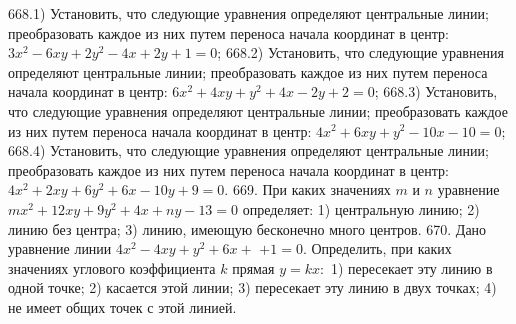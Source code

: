 668.1) Установить, что следующие уравнения определяют центральные линии; преобразовать каждое из них путем переноса начала координат в центр: $3 x^2-6 x y+2 y^2-4 x+2 y+1=0$;
668.2) Установить, что следующие уравнения определяют центральные линии; преобразовать каждое из них путем переноса начала координат в центр: $6 x^2+4 x y+y^2+4 x-2 y+2=0$;
668.3) Установить, что следующие уравнения определяют центральные линии; преобразовать каждое из них путем переноса начала координат в центр: $4 x^2+6 x y+y^2-10 x-10=0$;
668.4) Установить, что следующие уравнения определяют центральные линии; преобразовать каждое из них путем переноса начала координат в центр: $4 x^2+2 x y+6 y^2+6 x-10 y+9=0$.
669. При каких значениях $m$ и $n$ уравнение $m x^2+12 x y+9 y^2+4 x+n y-13=0$ определяет: 1) центральную линию; 2) линию без центра; 3) линию, имеющую бесконечно много центров.
670. Дано уравнение линии $4 x^2-4 x y+y^2+6 x+$ $+1=0$. Определить, при каких значениях углового коэффициента $k$ прямая $y=k x:$ 1) пересекает эту линию в одной точке; 2) касается этой линии; 3) пересекает эту линию в двух точках; 4) не имеет общих точек с этой линией.






